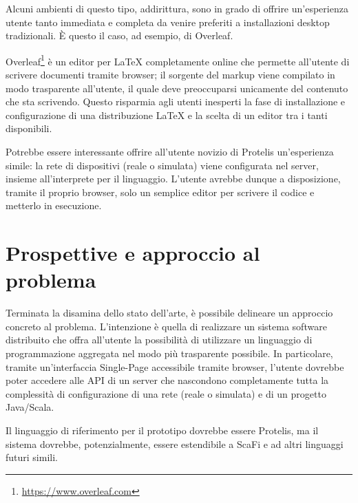   Alcuni ambienti di questo tipo, addirittura, sono in grado di offrire un'esperienza utente tanto immediata e completa da venire preferiti a installazioni desktop tradizionali.
  È questo il caso, ad esempio, di Overleaf.

  Overleaf\footnote{\url{https://www.overleaf.com}} è un editor per \LaTeX{} completamente online che permette all'utente di scrivere documenti tramite browser;
  il sorgente del markup viene compilato in modo trasparente all'utente, il quale deve preoccuparsi unicamente del contenuto che sta scrivendo.
  Questo risparmia agli utenti inesperti la fase di installazione e configurazione di una distribuzione \LaTeX{} e la scelta di un editor tra i tanti disponibili.

  Potrebbe essere interessante offrire all'utente novizio di Protelis un'esperienza simile:
  la rete di dispositivi (reale o simulata) viene configurata nel server, insieme all'interprete per il linguaggio.
  L'utente avrebbe dunque a disposizione, tramite il proprio browser, solo un semplice editor per scrivere il codice e metterlo in esecuzione.

  \section{Prospettive e approccio al problema}\label{sec:prospective}

  Terminata la disamina dello stato dell'arte, è possibile delineare un approccio concreto al problema.
  L'intenzione è quella di realizzare un sistema software distribuito che offra all'utente la possibilità di utilizzare un linguaggio di programmazione aggregata nel modo più trasparente possibile.
  In particolare, tramite un'interfaccia Single-Page accessibile tramite browser, l'utente dovrebbe poter accedere alle API di un server che nascondono completamente tutta la complessità di configurazione di una rete (reale o simulata) e di un progetto Java/Scala.

  Il linguaggio di riferimento per il prototipo dovrebbe essere Protelis, ma il sistema dovrebbe, potenzialmente, essere estendibile a ScaFi e ad altri linguaggi futuri simili.
